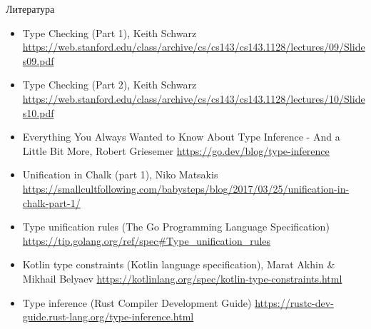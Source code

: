 \documentclass[xcolor=table]{beamer}
\begin{document}
    \begin{frame}[allowframebreaks]{Литература}
        \begin{itemize}
            \item Type Checking (Part 1), Keith Schwarz \url{https://web.stanford.edu/class/archive/cs/cs143/cs143.1128/lectures/09/Slides09.pdf}
            \item Type Checking (Part 2), Keith Schwarz \url{https://web.stanford.edu/class/archive/cs/cs143/cs143.1128/lectures/10/Slides10.pdf}
            \item Everything You Always Wanted to Know About Type Inference - And a Little Bit More, Robert Griesemer \url{https://go.dev/blog/type-inference}
            \item Unification in Chalk (part 1), Niko Matsakis \url{https://smallcultfollowing.com/babysteps/blog/2017/03/25/unification-in-chalk-part-1/}
        \end{itemize}
        
        \framebreak
        
        \begin{itemize}
            \item Type unification rules (The Go Programming Language Specification) \url{https://tip.golang.org/ref/spec\#Type_unification_rules}
            \item Kotlin type constraints (Kotlin language specification), Marat Akhin \& Mikhail Belyaev \url{https://kotlinlang.org/spec/kotlin-type-constraints.html}
            \item Type inference (Rust Compiler Development Guide) \url{https://rustc-dev-guide.rust-lang.org/type-inference.html}
        \end{itemize}
    \end{frame}
\end{document}
